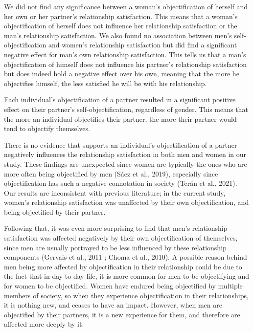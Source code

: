 \documentclass[
  man]{apa6}
\begin{document}
We did not find any significance between a woman's objectification of herself and her own or her partner's relationship satisfaction. This means that a woman's objectification of herself does not influence her relationship satisfaction or the man's relationship satisfaction. We also found no association between men's self-objectification and women's relationship satisfaction but did find a significant negative effect for man's own relationship satisfaction. This tells us that a man's objectification of himself does not influence his partner's relationship satisfaction but does indeed hold a negative effect over his own, meaning that the more he objectifies himself, the less satisfied he will be with his relationship.

Each individual's objectification of a partner resulted in a significant positive effect on their partner's self-objectification, regardless of gender. This means that the more an individual objectifies their partner, the more their partner would tend to objectify themselves.

There is no evidence that supports an individual's objectification of a partner negatively influences the relationship satisfaction in both men and women in our study. These findings are unexpected since women are typically the ones who are more often being objectified by men (Sáez et al., 2019), especially since objectification has such a negative connotation in society (Terán et al., 2021). Our results are inconsistent with previous literature; in the current study, women's relationship satisfaction was unaffected by their own objectification, and being objectified by their partner.

Following that, it was even more surprising to find that men's relationship satisfaction was affected negatively by their own objectification of themselves, since men are usually portrayed to be less influenced by these relationship components (Gervais et al., 2011 ; Choma et al., 2010). A possible reason behind men being more affected by objectification in their relationship could be due to the fact that in day-to-day life, it is more common for men to be objectifying and for women to be objectified. Women have endured being objectified by multiple members of society, so when they experience objectification in their relationships, it is nothing new, and ceases to have an impact. However, when men are objectified by their partners, it is a new experience for them, and therefore are affected more deeply by it.
\end{document}
